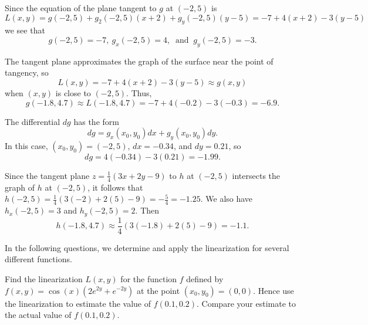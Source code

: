 \begin{exercises}
\begin{exerciseSolution}
    \ba
   	\item Since the equation of the plane tangent to $g$ at $(-2,5)$ is 
\[L(x,y) = g(-2,5) + g_2(-2,5)(x+2) + g_y(-2,5)(y-5) = -7 + 4(x+2) - 3(y-5)\]
we see that  
\[g(-2,5) = -7, \ g_x(-2,5) = 4, \ \text{ and } \ g_y(-2,5) = -3.\]
	\item The tangent plane approximates the graph of the surface near the point of tangency, so
\[L(x,y) = -7 + 4(x+2) - 3(y-5) \approx g(x,y)\]
when $(x,y)$ is close to $(-2,5)$. Thus,
\[g(-1.8,4.7) \approx L(-1.8,4.7) = -7 + 4(-0.2) - 3(-0.3) = -6.9.\]
	\item The differential $dg$ has the form 
\[dg = g_x(x_0, y_0)dx + g_y(x_0, y_0)dy.\]
In this case, $(x_0, y_0) = (-2,5)$, $dx = -0.34$, and $dy = 0.21$, so
\[dg = 4(-0.34) - 3(0.21) = -1.99.\]
	\item Since the tangent plane $z = \frac{1}{4}(3x+2y-9)$ to $h$ at $(-2,5)$ intersects the graph of $h$ at $(-2,5)$, it follows that $h(-2,5) = \frac{1}{4}(3(-2)+2(5)-9) = -\frac{5}{4} = -1.25$. We also have $h_x(-2,5) = 3$ and $h_y(-2,5) = 2$. Then
\[h(-1.8, 4.7) \approx \frac{1}{4}(3(-1.8)+2(5)-9) = -1.1.\]

    \ea
\end{exerciseSolution}

\item \label{Ez:10.4.2}   In the following questions, we determine and apply the linearization for several different functions.				
    \ba
   	\item Find the linearization $L(x,y)$ for the function $f$ defined by $f(x,y) = \cos(x)(2e^{2y}+e^{-2y})$
at the point $(x_0,y_0) = (0,0)$.  Hence use the linearization to estimate
the value of $f(0.1, 0.2)$.  Compare your estimate to the actual value of $f(0.1, 0.2)$.


\end{exercises}
